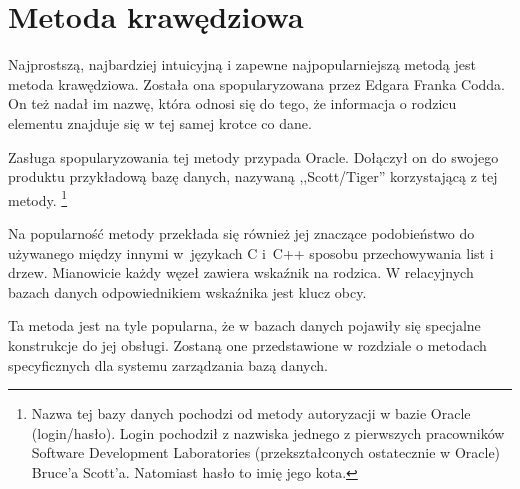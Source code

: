 \section{Metoda krawędziowa}








Najprostszą, najbardziej intuicyjną i zapewne najpopularniejszą metodą jest metoda krawędziowa.
Została ona spopularyzowana przez Edgara Franka Codda. 
On też nadał im nazwę, która odnosi się do tego, że informacja o rodzicu elementu znajduje się w tej samej krotce co dane.

Zasługa spopularyzowania tej metody przypada Oracle.
Dołączył on do swojego produktu przykładową bazę danych, nazywaną ,,Scott/Tiger'' 
korzystającą z tej metody.
\footnote{
    Nazwa tej bazy danych pochodzi od metody autoryzacji w bazie Oracle (login/hasło).
    Login pochodził z nazwiska jednego z pierwszych pracowników 
    Software Development Laboratories (przekształconych ostatecznie w Oracle) Bruce'a Scott'a. 
    Natomiast hasło to imię jego kota.
}

Na popularność metody przekłada się również jej znaczące podobieństwo do 
używanego między innymi w~językach C i~C++ sposobu przechowywania list i drzew.
Mianowicie każdy węzeł zawiera wskaźnik na rodzica. 
W relacyjnych bazach danych odpowiednikiem wskaźnika jest klucz obcy. 


Ta metoda jest na tyle popularna, że w bazach danych pojawiły się specjalne konstrukcje do jej obsługi. 
Zostaną one przedstawione w rozdziale  o metodach specyficznych dla systemu zarządzania bazą danych.


